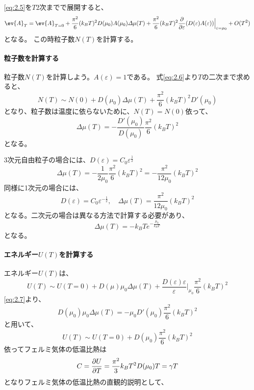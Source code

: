 \documentclass[titlepage]{ltjsarticle}
\begin{document}
\eqref{eq:2.5}を\(T\)2次までで展開すると、
\begin{equation}\label{eq:2.6}
  \ev{A}_T = \ev{A}_{T=0} + \frac{\pi^2}{6}(k_BT)^2 D(\mu_0)A(\mu_0)\varDelta \mu(T) + \frac{\pi^2}{6}(k_BT)^2 \pdv{}{\varepsilon}(D(\varepsilon)A(\varepsilon))\Big|_{\varepsilon=\mu_0} + O(T^2)
\end{equation}
となる。
この時粒子数\(N(T)\)を計算する。

\paragraph{粒子数を計算する}
粒子数\(N(T)\)を計算しよう。\(A(\varepsilon)=1\)である。
式\eqref{eq:2.6}より\(T\)の二次まで求めると、
\begin{equation}
  N(T) \sim N(0) + D(\mu_0)\Delta \mu(T) + \frac{\pi^2}{6}(k_BT)^2 D'(\mu_0)
\end{equation}
となり、粒子数は温度に依らないために、\(N(T)=N(0)\)依って、
\begin{equation}\label{eq:2.7}
  \varDelta \mu(T) = -\frac{D'(\mu_0)}{D(\mu_0)}\frac{\pi^2}{6}(k_BT)^2
\end{equation}
となる。


3次元自由粒子の場合には、\(D(\varepsilon)=C_0\varepsilon^{\frac{1}{2}}\)
\begin{equation}
  \varDelta \mu(T) = -\frac{1}{2\mu_0} \frac{\pi^2}{6}(k_BT)^2 = -\frac{\pi^2}{12\mu_0}(k_BT)^2
\end{equation}
同様に1次元の場合には、
\begin{equation}
  D(\varepsilon) = C_0\varepsilon^{-\frac{1}{2}} , \quad \varDelta \mu(T) = \frac{\pi^2}{12 \mu_0}(k_BT)^2
\end{equation}
となる。二次元の場合は異なる方法で計算する必要があり、
\begin{equation}
  \varDelta \mu(T) = -k_BT e^{-\frac{\mu_0}{k_BT}}
\end{equation}
となる。

\paragraph{エネルギー\(U(T)\)を計算する}
エネルギー\(U(T)\)は、
\begin{equation}
  U(T) \sim U(T=0) + D(\mu)\mu_0 \varDelta \mu(T) + \frac{D(\varepsilon)\varepsilon}{\varepsilon}\Big|_{\mu_0}\frac{\pi^2}{6}(k_BT)^2
\end{equation}
\eqref{eq:2.7}より、
\begin{equation}
  D(\mu_0)\mu_0 \varDelta \mu(T) = -\mu_0 D'(\mu_0)\frac{\pi^2}{6}(k_BT)^2
\end{equation}
と用いて、
\begin{equation}
  U(T) \sim U(T=0) + D(\mu_0) \frac{\pi^2}{6}(k_BT)^2 
\end{equation}
依ってフェルミ気体の低温比熱は
\begin{equation}
  C = \pdv{U}{T} = \frac{\pi^2}{3}k_BT^2 D(\mu_0) T = \gamma T 
\end{equation}
となりフェルミ気体の低温比熱の直観的説明として、
\end{document}
